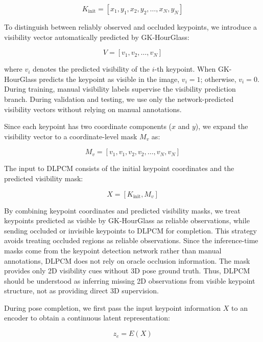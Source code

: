 \documentclass[computers,article,submit,pdftex,moreauthors]{Definitions/mdpi}
\begin{document}
\begin{equation}
K_{\text{init}} = [x_1, y_1, x_2, y_2, \ldots, x_N, y_N]
\end{equation}

To distinguish between reliably observed and occluded keypoints, we introduce a visibility vector automatically predicted by GK-HourGlass:

\begin{equation}
V = [v_1, v_2, \ldots, v_N]
\end{equation}

where $v_i$ denotes the predicted visibility of the $i$-th keypoint. When GK-HourGlass predicts the keypoint as visible in the image, $v_i = 1$; otherwise, $v_i = 0$. During training, manual visibility labels supervise the visibility prediction branch. During validation and testing, we use only the network-predicted visibility vectors without relying on manual annotations.

Since each keypoint has two coordinate components ($x$ and $y$), we expand the visibility vector to a coordinate-level mask $M_v$ as:

\begin{equation}
M_v = [v_1, v_1, v_2, v_2, \ldots, v_N, v_N]
\end{equation}

The input to DLPCM consists of the initial keypoint coordinates and the predicted visibility mask:

\begin{equation}
X = [K_{\text{init}}, M_v]
\end{equation}

By combining keypoint coordinates and predicted visibility masks, we treat keypoints predicted as visible by GK-HourGlass as reliable observations, while sending occluded or invisible keypoints to DLPCM for completion. This strategy avoids treating occluded regions as reliable observations. Since the inference-time masks come from the keypoint detection network rather than manual annotations, DLPCM does not rely on oracle occlusion information. The mask provides only 2D visibility cues without 3D pose ground truth. Thus, DLPCM should be understood as inferring missing 2D observations from visible keypoint structure, not as providing direct 3D supervision.

During pose completion, we first pass the input keypoint information $X$ to an encoder to obtain a continuous latent representation:

\begin{equation}
z_e = E(X)
\end{equation}
\end{document}
